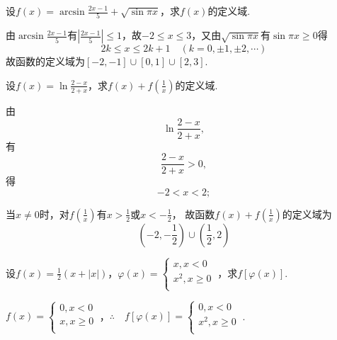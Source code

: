 \begin{problem}
	设$\displaystyle f\left( x \right) = \arcsin\frac{2x - 1}{5} + \sqrt{\sin\pi x}$，求$f\left( x \right)$的定义域.
	
	\begin{solution}
		由$\displaystyle \arcsin\frac{2x - 1}{5}$有$\displaystyle \left| \frac{2x - 1}{5} \right| \leq 1$，故$- 2 \leq x \leq 3$，又由$\sqrt{\sin\pi x}$有$\sin\pi x \geq 0$得
		$$2k \leq x \leq 2k + 1\quad\left( k = 0, \pm 1, \pm 2,\cdots \right)$$
		故函数的定义域为$\displaystyle \left\lbrack - 2, - 1 \right\rbrack \cup \left\lbrack 0,1 \right\rbrack \cup \left\lbrack 2,3 \right\rbrack$.
\end{solution}   
\end{problem}


\begin{problem}设$\displaystyle f\left( x \right) = \ln\frac{2 - x}{2 + x}$，求$\displaystyle f\left( x \right) + f\left( \frac{1}{x} \right)$的定义域.
	
	
	
	\begin{solution}
		由$$\ln\frac{2 - x}{2 + x},$$ 有$$\frac{2 - x}{2 + x} > 0,$$ 得$$- 2 < x < 2;$$
			
		当$x \neq 0$时，对$\displaystyle f\left( \frac{1}{x} \right)$有$\displaystyle x > \frac{1}{2}$或$\displaystyle x < - \frac{1}{2}$，
			故函数$\displaystyle f\left( x \right) + f\left( \frac{1}{x} \right)$的定义域为
			$$\left( - 2, - \frac{1}{2} \right) \cup \left( \frac{1}{2},2 \right)$$
	\end{solution}   \end{problem}
	\begin{problem}设$\displaystyle f\left( x \right) = \frac{1}{2}\left( x + \left| x \right| \right)$，$\varphi\left( x \right) = \left\{ \begin{matrix}
		x,x < 0 \\
		x^{2},x \geq 0 \\
		\end{matrix} \right.\ $，求$f\left\lbrack \varphi\left( x \right) \right\rbrack$.
		
		\begin{solution} $f\left( x \right) = \left\{ \begin{matrix}
			0,x < 0 \\
			x,x \geq 0 \\
			\end{matrix} \right.\ $，$\therefore\quad f\left\lbrack \varphi\left( x \right) \right\rbrack = \left\{ \begin{matrix}
			0,x < 0 \\
			x^{2},x \geq 0 \\
			\end{matrix} \right.\ $.
	\end{solution}   \end{problem}
